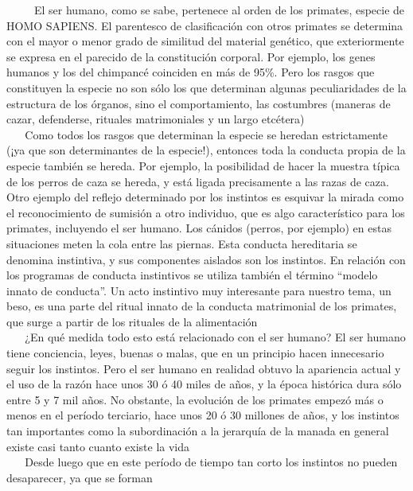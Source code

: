 ~ ~ ~ El ser humano, como se sabe, pertenece al orden de los primates,
especie de HOMO SAPIENS. El parentesco de clasificación con otros
primates se determina con el mayor o menor grado de similitud del
material genético, que exteriormente se expresa en el parecido de la
constitución corporal. Por ejemplo, los genes humanos y los del
chimpancé coinciden en más de 95\%. Pero los rasgos que constituyen la
especie no son sólo los que determinan algunas peculiaridades de la
estructura de los órganos, sino el comportamiento, las costumbres
(maneras de cazar, defenderse, rituales matrimoniales y un largo
etcétera)\\
\hspace*{0.333em} ~ ~ Como todos los rasgos que determinan la especie se
heredan estrictamente (¡ya que son determinantes de la especie!),
entonces toda la conducta propia de la especie también se hereda. Por
ejemplo, la posibilidad de hacer la muestra típica de los perros de caza
se hereda, y está ligada precisamente a las razas de caza. Otro ejemplo
del reflejo determinado por los instintos es esquivar la mirada como el
reconocimiento de sumisión a otro individuo, que es algo característico
para los primates, incluyendo el ser humano. Los cánidos (perros, por
ejemplo) en estas situaciones meten la cola entre las piernas. Esta
conducta hereditaria se denomina instintiva, y sus componentes aislados
son los instintos. En relación con los programas de conducta instintivos
se utiliza también el término ``modelo innato de conducta''. Un acto
instintivo muy interesante para nuestro tema, un beso, es una parte del
ritual innato de la conducta matrimonial de los primates, que surge a
partir de los rituales de la alimentación\\
\hspace*{0.333em} ~ ~ ¿En qué medida todo esto está relacionado con el
ser humano? El ser humano tiene conciencia, leyes, buenas o malas, que
en un principio hacen innecesario seguir los instintos. Pero el ser
humano en realidad obtuvo la apariencia actual y el uso de la razón hace
unos 30 ó 40 miles de años, y la época histórica dura sólo entre 5 y 7
mil años. No obstante, la evolución de los primates empezó más o menos
en el período terciario, hace unos 20 ó 30 millones de años, y los
instintos tan importantes como la subordinación a la jerarquía de la
manada en general existe casi tanto cuanto existe la vida\\
\hspace*{0.333em} ~ ~ Desde luego que en este período de tiempo tan
corto los instintos no pueden desaparecer, ya que se forman
